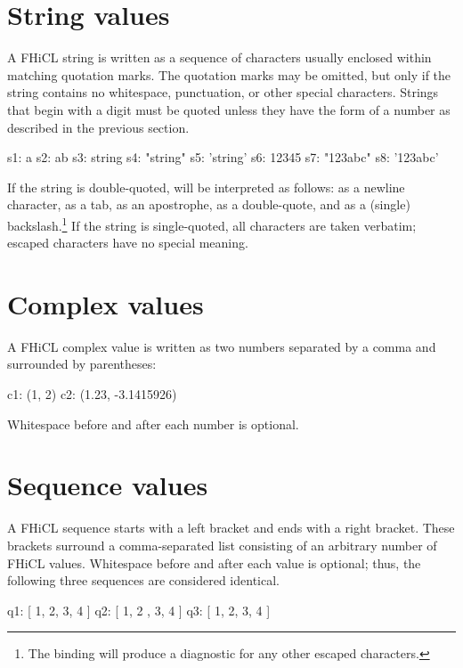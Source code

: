 \documentclass{memarticle}
\newcommand{\fhicl}%
 {FHiCL\xspace}
\begin{document}
\section{String values}

A \fhicl string is written as a sequence of characters
usually enclosed within matching quotation marks.
The quotation marks may be omitted,
but only if the string
contains no whitespace, punctuation, or other special characters. 
Strings that begin with a digit must be quoted
unless they have the form of a number
as described in the previous section.
\Needspace{1.34in}
\begin{fcllisting}[texcl,escapechar=`]
s1: a
s2: ab
s3: string
s4: "string"
s5: 'string'
s6: 12345
s7: "123abc"
s8: '123abc'
\end{fcllisting}

If the string is double-quoted,
 will be interpreted as follows:
  \fclcode{\\n} as a newline character,
  \fclcode{\\t} as a tab,
   as an apostrophe,
   as a double-quote,
and
  \fclcode{\\\\} as a (single) backslash.\footnote{%
                 The binding will produce a diagnostic
                 for any other escaped characters.%
                 }
If the string is single-quoted,
all characters are taken verbatim;
escaped characters have no special meaning.

\section{Complex values}

A \fhicl complex value is written
as two numbers
separated by a comma
and surrounded
by parentheses:
\Needspace{0.34in}
\begin{fcllisting}[texcl,escapechar=`]
c1: (1, 2)
c2: (1.23, -3.1415926)
\end{fcllisting}
Whitespace before and after each number is optional.

\section{Sequence values}

A \fhicl sequence starts with a left bracket
and ends with a right bracket.
These brackets surround
a comma-separated list
consisting of an arbitrary number
of \fhicl values.
Whitespace before and after each value is optional;
thus, the following three sequences are considered identical.
\Needspace{1.67in}
\begin{fcllisting}[texcl,escapechar=`]
q1: [ 1, 2, 3, 4 ]
q2: [ 1, 2
    , 3, 4
    ]
q3: [
      1,
      2,
      3,
      4
    ]
\end{fcllisting}
\end{document}
